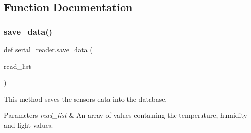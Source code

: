 \subsection{Function Documentation}
\mbox{\label{namespaceserial__reader_a7c6e4b70b62301983b7195509698fdee}} 
\subsubsection{\texorpdfstring{save\+\_\+data()}{save\_data()}}
{\footnotesize\ttfamily def serial\+\_\+reader.\+save\+\_\+data (\begin{DoxyParamCaption}\item[{}]{read\+\_\+list }\end{DoxyParamCaption})}



This method saves the sensors data into the database. 


\begin{DoxyParams}{Parameters}
{\em read\+\_\+list} & An array of values containing the temperature, humidity and light values. \\
\hline
\end{DoxyParams}
